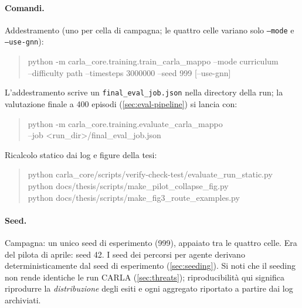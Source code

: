 \paragraph{Comandi.}
Addestramento (uno per cella di campagna; le quattro celle variano solo
\texttt{--mode} e \texttt{--use-gnn}):
\begin{quote}\small\ttfamily
python -m carla\_core.training.train\_carla\_mappo --mode curriculum\\
\hspace*{2em}--difficulty path --timesteps 3000000 --seed 999 [--use-gnn]
\end{quote}
L'addestramento scrive un \texttt{final\_eval\_job.json} nella directory
della run; la valutazione finale a 400 episodi
(\cref{sec:eval-pipeline}) si lancia con:
\begin{quote}\small\ttfamily
python -m carla\_core.training.evaluate\_carla\_mappo\\
\hspace*{2em}--job <run\_dir>/final\_eval\_job.json
\end{quote}
Ricalcolo statico dai log e figure della tesi:
\begin{quote}\small\ttfamily
python carla\_core/scripts/verify-check-test/evaluate\_run\_static.py \\
python docs/thesis/scripts/make\_pilot\_collapse\_fig.py \\
python docs/thesis/scripts/make\_fig3\_route\_examples.py
\end{quote}

\paragraph{Seed.}
Campagna: un unico seed di esperimento (999), appaiato tra le quattro
celle. Era del pilota di aprile: seed 42. I seed dei percorsi per
agente derivano deterministicamente dal seed di esperimento
(\cref{sec:seeding}). Si noti che il seeding non rende identiche le run
CARLA (\cref{sec:threats}); riproducibilità qui significa riprodurre la
\emph{distribuzione} degli esiti e ogni aggregato riportato a partire
dai log archiviati.
